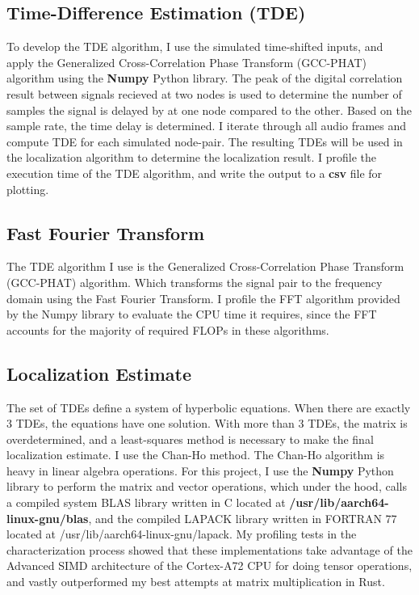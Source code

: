 \documentclass[12pt]{article}
\begin{document}
\subsection{Time-Difference Estimation (TDE)}
	To develop the TDE algorithm, I use the simulated time-shifted inputs, and apply the Generalized Cross-Correlation Phase Transform (GCC-PHAT) algorithm using the \textbf{Numpy} Python library. The peak of the digital correlation result between signals recieved at two nodes is used to determine the number of samples the signal is delayed by at one node compared to the other. Based on the sample rate, the time delay is determined.
	I iterate through all audio frames and compute TDE for each simulated node-pair. The resulting TDEs will be used in the localization algorithm to determine the localization result. I profile the execution time of the TDE algorithm, and write the output to a \textbf{csv} file for plotting.
	
\subsection{Fast Fourier Transform}
	The TDE algorithm I use is the Generalized Cross-Correlation Phase Transform (GCC-PHAT) algorithm. Which transforms the signal pair to the frequency domain using the Fast Fourier Transform. I profile the FFT algorithm provided by the Numpy library to evaluate the CPU time it requires, since the FFT accounts for the majority of required FLOPs in these algorithms. 
	
\subsection{Localization Estimate}
	The set of TDEs define a system of hyperbolic equations. When there are exactly 3 TDEs, the equations have one solution. With more than 3 TDEs, the matrix is overdetermined, and a least-squares method is necessary to make the final localization estimate. I use the Chan-Ho method. The Chan-Ho algorithm is heavy in linear algebra operations. For this project, I use the \textbf{Numpy} Python library to perform the matrix and vector operations, which under the hood, calls a compiled system BLAS library written in C located at \textbf{/usr/lib/aarch64-linux-gnu/blas}, and the compiled LAPACK library written in FORTRAN 77 located at {/usr/lib/aarch64-linux-gnu/lapack}. My profiling tests in the characterization process showed that these implementations take advantage of the Advanced SIMD architecture of the Cortex-A72 CPU for doing tensor operations, and vastly outperformed my best attempts at matrix multiplication in Rust.
\end{document}
